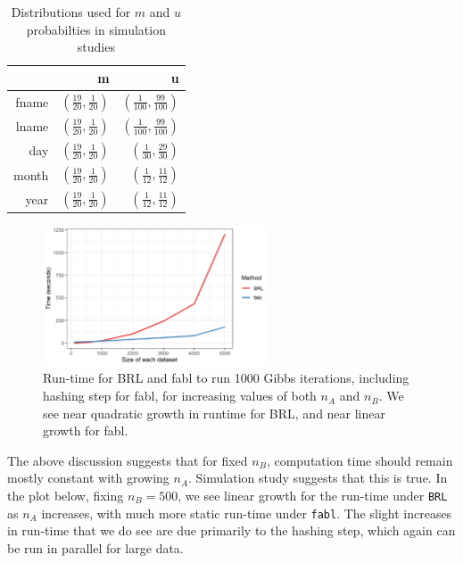 \documentclass[12pt,letterpaper]{article}
\newcommand{\1}[1]{\mathbb{I}\!\left[#1\right]} %
\begin{document}
\begin{table}[t]
	\centering
	\begin{tabular}{rrr}
		\hline
		& m & u \\ 
		\hline
		fname & $\left(\frac{19}{20}, \frac{1}{20}\right)$ & $\left(\frac{1}{100}, \frac{99}{100}\right)$ \\ 
		lname & $\left(\frac{19}{20}, \frac{1}{20}\right)$ & $\left(\frac{1}{100}, \frac{99}{100}\right)$ \\ 
		day & $\left(\frac{19}{20}, \frac{1}{20}\right)$ & $\left(\frac{1}{30}, \frac{29}{30}\right)$ \\ 
		month & $\left(\frac{19}{20}, \frac{1}{20}\right)$ & $\left(\frac{1}{12}, \frac{11}{12}\right)$ \\ 
		year & $\left(\frac{19}{20}, \frac{1}{20}\right)$ & $\left(\frac{1}{12}, \frac{11}{12}\right)$ \\ 
		\hline
	\end{tabular}
\caption{Distributions used for $m$ and $u$ probabilties in simulation studies}\label{fig:distributions}
\end{table}


\begin{figure}[ht]
	
	{\centering \includegraphics[width=0.6\textwidth]{../notes/figures/sadinle_speed_plot2} 
		
	}
	
	\caption{Run-time for BRL and fabl to run 1000 Gibbs iterations, including hashing step for fabl, for increasing values of both $n_A$ and $n_B$. We see near quadratic growth in runtime for BRL, and near linear growth for fabl.}\label{fig:speed1}
\end{figure}

The above discussion suggests that for fixed \(n_B\), computation time
should remain mostly constant with growing \(n_A\). Simulation study
suggests that this is true. In the plot below, fixing \(n_B = 500\), we
see linear growth for the run-time under \texttt{BRL} as \(n_A\)
increases, with much more static run-time under \texttt{fabl}. The
slight increases in run-time that we do see are due primarily to the
hashing step, which again can be run in parallel for large data.
\end{document}
